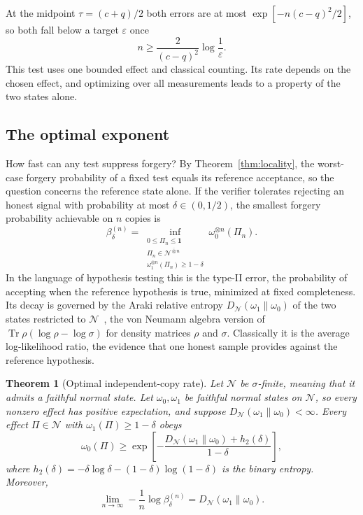\documentclass[11pt,a4paper]{article}
\newtheorem{theorem}{Theorem}
\newcommand{\N}{\mathcal{N}}
\begin{document}
At the midpoint $\tau=(c+q)/2$ both errors are at most $\exp[-n(c-q)^2/2]$, so both fall below a target $\varepsilon$ once
\begin{equation}
n\ge \frac{2}{(c-q)^2}\log\frac1\varepsilon.
\label{eq:sample-complexity}
\end{equation}
This test uses one bounded effect and classical counting. Its rate depends on the chosen effect, and optimizing over all measurements leads to a property of the two states alone.

\subsection{The optimal exponent}

How fast can any test suppress forgery? By Theorem~\ref{thm:locality}, the worst-case forgery probability of a fixed test equals its reference acceptance, so the question concerns the reference state alone. If the verifier tolerates rejecting an honest signal with probability at most $\delta\in(0,1/2)$, the smallest forgery probability achievable on $n$ copies is
\begin{equation}
\beta_{\delta}^{(n)}
=\inf_{\substack{0\le\Pi_n\le\mathbf{1}\\
\Pi_n\in\N^{\bar\otimes n}\\
\omega_1^{\otimes n}(\Pi_n)\ge1-\delta}}
\omega_0^{\otimes n}(\Pi_n).
\label{eq:beta}
\end{equation}
In the language of hypothesis testing this is the type-II error, the probability of accepting when the reference hypothesis is true, minimized at fixed completeness. Its decay is governed by the Araki relative entropy $D_{\N}(\omega_1\|\omega_0)$ of the two states restricted to $\N$~\cite{araki1976relative}, the von Neumann algebra version of $\operatorname{Tr}\rho(\log\rho-\log\sigma)$ for density matrices $\rho$ and $\sigma$. Classically it is the average log-likelihood ratio, the evidence that one honest sample provides against the reference hypothesis.

\begin{theorem}[Optimal independent-copy rate]
\label{thm:stein}
Let $\N$ be $\sigma$-finite, meaning that it admits a faithful normal state. Let $\omega_0,\omega_1$ be faithful normal states on $\N$, so every nonzero effect has positive expectation, and suppose
$D_{\N}(\omega_1\|\omega_0)<\infty$. Every effect $\Pi\in\N$ with $\omega_1(\Pi)\ge1-\delta$ obeys
\begin{equation}
\omega_0(\Pi)
\ge
\exp\!\left[
-\frac{D_{\N}(\omega_1\|\omega_0)+h_2(\delta)}
{1-\delta}
\right],
\label{eq:one-shot-converse}
\end{equation}
where $h_2(\delta)=-\delta\log\delta-(1-\delta)\log(1-\delta)$ is the binary entropy. Moreover,
\begin{equation}
\lim_{n\to\infty}
-\frac1n\log\beta_{\delta}^{(n)}
=D_{\N}(\omega_1\|\omega_0).
\label{eq:stein}
\end{equation}
\end{theorem}
\end{document}

